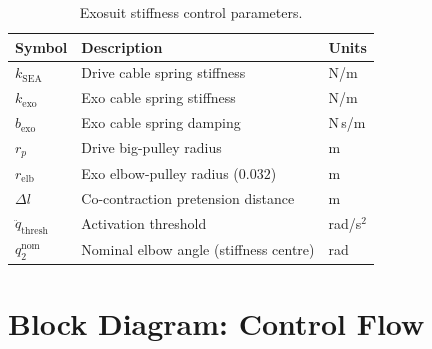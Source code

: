\documentclass[11pt, a4paper]{article}
\begin{document}
\begin{table}[h]
\centering
\begin{tabular}{@{}lll@{}}
\toprule
\textbf{Symbol} & \textbf{Description} & \textbf{Units} \\
\midrule
$k_{\text{SEA}}$        & Drive cable spring stiffness       & N/m \\
$k_{\text{exo}}$        & Exo cable spring stiffness         & N/m \\
$b_{\text{exo}}$        & Exo cable spring damping           & N\,s/m \\
$r_p$                   & Drive big-pulley radius            & m \\
$r_{\text{elb}}$        & Exo elbow-pulley radius ($0.032$)  & m \\
$\Delta l$              & Co-contraction pretension distance  & m \\
$\ddot{q}_{\text{thresh}}$ & Activation threshold            & rad/s$^2$ \\
$q_2^{\text{nom}}$      & Nominal elbow angle (stiffness centre) & rad \\
\bottomrule
\end{tabular}
\caption{Exosuit stiffness control parameters.}
\label{tab:params}
\end{table}

\section{Block Diagram: Control Flow}
\end{document}

